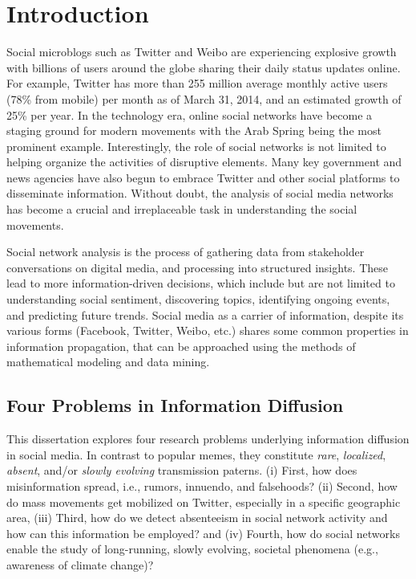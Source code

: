 \chapter{Introduction}
Social microblogs such as Twitter and Weibo are experiencing explosive growth with billions of users around the globe sharing their daily status updates online. For example, Twitter has more than 255 million average monthly active users (78\% from mobile) per month as of March 31, 2014, and an estimated growth of 25\% per year. In the technology era, online social networks have become a staging ground for modern movements with the Arab Spring being the most prominent example. Interestingly, the role of social networks is not limited to helping organize the activities of disruptive elements. Many key government and news agencies have also begun to embrace Twitter and other social platforms to disseminate information. Without doubt, the analysis of social media networks has become a crucial and irreplaceable task in understanding the social movements.

Social network analysis is the process of gathering data from stakeholder conversations on digital media, and processing into structured insights. These lead to more information-driven decisions, which include but are not limited to understanding social sentiment, discovering topics, identifying ongoing events, and predicting future trends. Social media as a carrier of information, despite its various forms (Facebook, Twitter, Weibo, etc.) 
shares some common properties in information propagation, that can be approached
using the methods of mathematical modeling and data mining. 

\section{Four Problems in Information Diffusion}
This dissertation explores four research problems underlying information diffusion in
social media.
In contrast to popular memes, they constitute
{\it rare}, {\it localized}, {\it absent}, and/or  {\it slowly evolving} transmission paterns.
(i) First, how does misinformation spread, i.e.,
rumors, innuendo, and falsehoods? (ii) Second, how do mass movements get mobilized
on Twitter, especially in a specific geographic area, (iii) Third, how do we detect
absenteeism in social network activity and how can this information be employed?
and (iv) Fourth, how do social
networks enable the study of long-running, slowly evolving, societal phenomena (e.g., awareness of
climate change)?\\

